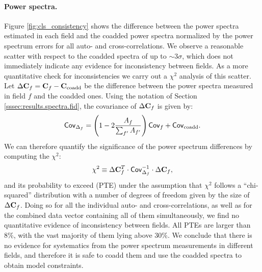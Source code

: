\documentclass[a4paper,11pt]{article}
\begin{document}
      \paragraph{Power spectra.} Figure \ref{fig:cls_consistency} shows the difference between the power spectra estimated in each field and the coadded power spectra normalized by the power spectrum errors for all auto- and cross-correlations. We observe a reasonable scatter with respect to the coadded spectra of up to $\sim3\sigma$, which does not immediately indicate any evidence for inconsistency between fields. As a more quantitative check for inconsistencies we carry out a $\chi^2$ analysis of this scatter. Let  $\Delta {\bf C}_f={\bf C}_f-{\bf C}_{\rm coadd}$ be the difference between the power spectra measured in field $f$ and the coadded ones. Using the notation of Section \ref{sssec:results.spectra.fid}, the covariance of $\Delta {\bf C}_f$ is given by:
      \begin{equation}
        {\sf Cov}_{\Delta_f}=\left(1-2\frac{A_f}{\sum_{f'}A_{f'}}\right){\sf Cov}_f+{\sf Cov}_{\rm coadd}.
      \end{equation}
      We can therefore quantify the significance of the power spectrum differences by computing the $\chi^2$:
      \begin{equation}
        \chi^2\equiv\Delta{\bf C}_f^T\cdot{\sf Cov}_{\Delta_f}^{-1}\cdot\Delta{\bf C}_f,
      \end{equation}
      and its probability to exceed (PTE) under the assumption that $\chi^2$ follows a ``chi-squared'' distribution with a number of degrees of freedom given by the size of $\Delta{\bf C}_f$. Doing so for all the individual auto- and cross-correlations, as well as for the combined data vector containing all of them simultaneously, we find no quantitative evidence of inconsistency between fields. All PTEs are larger than 8\%, with the vast majority of them lying above 30\%. We conclude that there is no evidence for systematics from the power spectrum measurements in different fields, and therefore it is safe to coadd them and use the coadded spectra to obtain model constraints.
\end{document}
